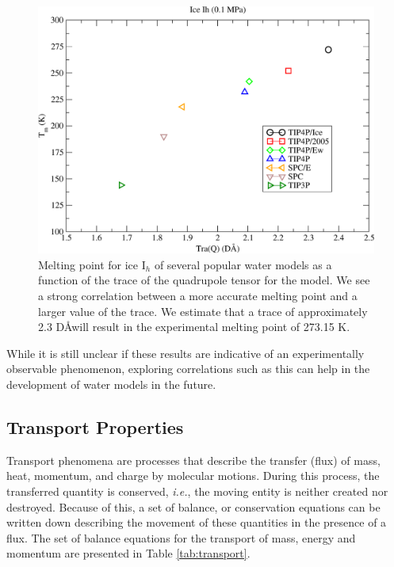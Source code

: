 \begin{figure}
\includegraphics[width = \linewidth]{Figures/Tm_Ih_TraQ_plot.pdf}
\caption{\label{fig:TraQ} Melting point for ice I$_h$ of several popular water models as a function of the trace of the quadrupole tensor for the model. We see a strong correlation between a more accurate melting point and a larger value of the trace. We estimate that a trace of approximately 2.3 D\AA will result in the experimental melting point of 273.15 K.}
\end{figure}

While it is still unclear if these results are indicative of an
experimentally observable phenomenon, exploring correlations such as
this can help in the development of water models in the future. 


\subsection{Transport Properties}
Transport phenomena are processes that describe the transfer (flux) of
mass, heat, momentum, and charge by molecular motions. During this
process, the transferred quantity is conserved, \textit{i.e.}, the
moving entity is neither created nor destroyed. Because of this, a set
of balance, or conservation equations can be written down describing
the movement of these quantities in the presence of a flux. The set of
balance equations for the transport of mass, energy and momentum are
presented in Table \ref{tab:transport}. 


